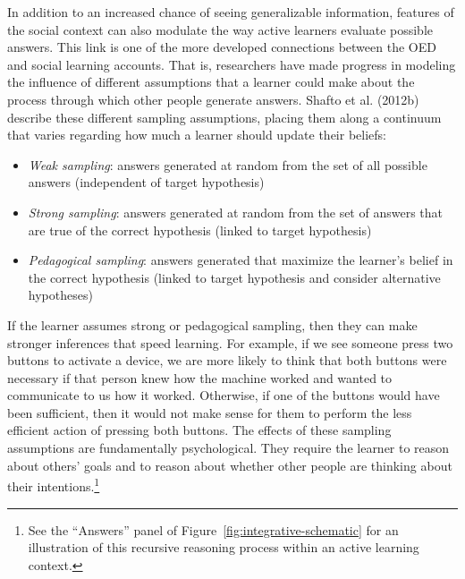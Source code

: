 \documentclass[oneside]{report}
\begin{document}
In addition to an increased chance of seeing generalizable information,
features of the social context can also modulate the way active learners
evaluate possible answers. This link is one of the more developed
connections between the OED and social learning accounts. That is,
researchers have made progress in modeling the influence of different
assumptions that a learner could make about the process through which
other people generate answers. Shafto et al. (2012b) describe these
different sampling assumptions, placing them along a continuum that
varies regarding how much a learner should update their beliefs:
\begin{itemize}
\tightlist
\item
  \emph{Weak sampling}: answers generated at random from the set of all
  possible answers (independent of target hypothesis)
\item
  \emph{Strong sampling}: answers generated at random from the set of
  answers that are true of the correct hypothesis (linked to target
  hypothesis)
\item
  \emph{Pedagogical sampling}: answers generated that maximize the
  learner's belief in the correct hypothesis (linked to target
  hypothesis and consider alternative hypotheses)
\end{itemize}
\noindent
If the learner assumes strong or pedagogical sampling, then they can
make stronger inferences that speed learning. For example, if we see
someone press two buttons to activate a device, we are more likely to
think that both buttons were necessary if that person knew how the
machine worked and wanted to communicate to us how it worked. Otherwise,
if one of the buttons would have been sufficient, then it would not make
sense for them to perform the less efficient action of pressing both
buttons. The effects of these sampling assumptions are fundamentally
psychological. They require the learner to reason about others' goals
and to reason about whether other people are thinking about their
intentions.\footnote{See the ``Answers'' panel of
  Figure~\ref{fig:integrative-schematic} for an illustration of this
  recursive reasoning process within an active learning context.}
\end{document}

